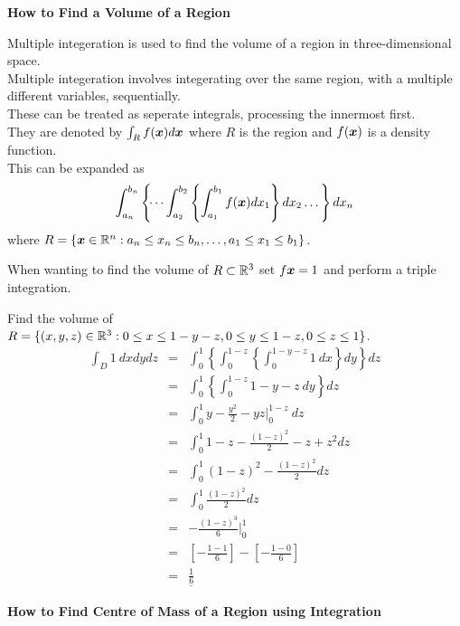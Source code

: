 \documentclass[11pt,a4paper]{article}
\begin{document}
\textbf{How to Find a Volume of a Region}\\

\subtitle{Theory}
Multiple integeration is used to find the volume of a region in three-dimensional space.\\
Multiple integeration involves integerating over the same region, with a multiple different variables, sequentially.\\
These can be treated as seperate integrals, processing the innermost first.\\
They are denoted by $\int_R f(\boldsymbol{x})d\boldsymbol{x}$ where $R$ is the region and $f(\boldsymbol{x})$ is a density function.\\
This can be expanded as
$$\int_{a_n}^{b_n} \left\{ \dots \int_{a_2}^{b_2} \left\{ \int_{a_1}^{b_1} f(\boldsymbol{x}) dx_1 \right\} dx_2 \dots \right\} dx_n$$
where $R = \{ \boldsymbol{x} \in \mathbb{R}^n : a_n \leq x_n \leq b_n, \dots, a_1 \leq x_1 \leq b_1\}$.\\

\subtitle{Process}
When wanting to find the volume of $R \subset \mathbb{R}^3$ set $f\boldsymbol{x} = 1$ and perform a triple integration.\\

\subtitle{Example}
Find the volume of $R = \{(x, y, z) \in \mathbb{R}^3 : 0 \leq x \leq 1-y-z, 0 \leq y \leq 1-z, 0 \leq z \leq 1\}$.
\[\begin{array}{rcl}
\int_D1\ dxdydz &=& \displaystyle{\int_{0}^{1} \left\{ \int_{0}^{1-z} \left\{ \int_{0}^{1-y-z} 1\ dx \right\} dy \right\} dz}\\
&=& \displaystyle{\int_{0}^{1} \left\{ \int_{0}^{1-z} 1-y-z\ dy \right\} dz}\\
&=& \displaystyle{\int_{0}^{1} y - \frac{y^2}{2} -yz \big|_0^{1-z}\ dz}\\
&=& \displaystyle{\int_0^1 1 - z - \frac{(1-z)^2}{2} -z + z^2 dz}\\
&=& \displaystyle{\int_0^1 (1-z)^2 - \frac{(1-z)^2}{2} dz}\\
&=& \displaystyle{\int_0^1 \frac{(1-z)^2}{2} dz}\\
&=& \displaystyle{-\frac{(1-z)^3}{6} \big|_0^1}\\
&=& \left[-\frac{1-1}{6}\right] - \left[-\frac{1-0}{6}\right]\\
&=& \displaystyle{\underline{\frac{1}{6}}}
\end{array}\]

\newpage\textbf{How to Find Centre of Mass of a Region using Integration}\\
\end{document}
